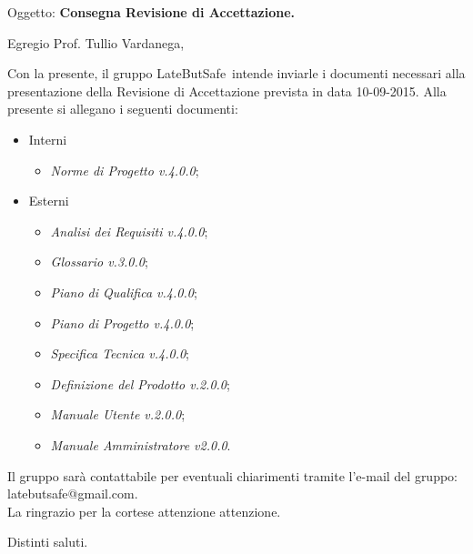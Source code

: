 \documentclass{letter}
\makeatletter
\newcommand{\DefinizioneDelProdotto}{\textit{Definizione del Prodotto v.2.0.0}}
\newcommand{\SpecificaTecnica}{\textit{Specifica Tecnica v.4.0.0}}
\newcommand{\AnalisiDeiRequisiti}{\textit{Analisi dei Requisiti v.4.0.0}}
\newcommand{\PianoDiProgetto}{\textit{Piano di Progetto v.4.0.0}}
\newcommand{\NormeDiProgetto}{\textit{Norme di Progetto v.4.0.0}}
\newcommand{\PianoDiQualifica}{\textit{Piano di Qualifica v.4.0.0}}
\newcommand{\ManualeUtente}{\textit{Manuale Utente v.2.0.0}}
\newcommand{\ManualeAmministratore}{\textit{Manuale Amministratore v2.0.0}}
\newcommand{\Glossario}{\textit{Glossario v.3.0.0}}
\newcommand{\gruppo}{LateButSafe}
\newcommand{\mail}{latebutsafe@gmail.com}
\newcommand{\Vardanega}{Prof. Tullio Vardanega}
\makeatother
\begin{document}
	
	\begin{letter}{Oggetto: \textbf{Consegna Revisione di Accettazione.}}
	\opening {Egregio \Vardanega ,}
	Con la presente, il gruppo \gruppo\ intende inviarle i documenti necessari alla presentazione della Revisione di Accettazione prevista in data 10-09-2015.
	Alla presente si allegano i seguenti documenti:
			\begin{itemize}
				\item Interni
					\begin{itemize}
						\item \NormeDiProgetto;
					\end{itemize}
				\item Esterni
					\begin{itemize}
						\item \AnalisiDeiRequisiti;
						\item \Glossario;
						\item \PianoDiQualifica;
						\item \PianoDiProgetto;
						\item \SpecificaTecnica;
						\item \DefinizioneDelProdotto;
						\item \ManualeUtente;
						\item \ManualeAmministratore.
					\end{itemize}
			\end{itemize} 
		Il gruppo sarà  contattabile per eventuali chiarimenti tramite l'e-mail del gruppo: \mail.	\\
		La ringrazio per la cortese attenzione attenzione.
		
		\thispagestyle{fancy}
		\closing{Distinti saluti.}
		\signature{Manuel Fossa\\
					Responsabile di Progetto\\
					\gruppo}
   \end{letter}
\end{document}

